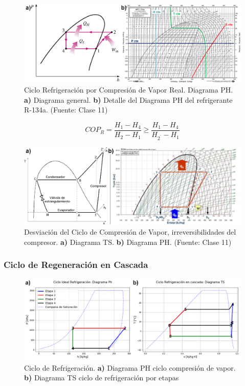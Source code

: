        \begin{figure}[H]
            \includegraphics[width=\textwidth]{img/clases/ciclo_carnot_inv_ph.png}
            \caption[Ciclo por Compresión de Vapor: Diagrama PH]{Ciclo Refrigeración por Compresión de Vapor Real. Diagrama PH. \textbf{a)} Diagrama general. \textbf{b)} Detalle del Diagrama PH del refrigerante R-134a. (Fuente: Clase 11)}
            \label{fig:ciclo_carnot_inv_ph}
        \end{figure}
        
        \[{COP}_{R} = \frac{H_{1}-H_{4}}{H_{2}-H_{1}} \geq \frac{H_{1}-H_{4}}{H_{2^{'}}-H_{1}}\]
        
        \begin{figure}[H]
            \includegraphics[width=\textwidth]{img/clases/ciclo_comp_vapor.png}
            \caption[Desviación del Ciclo por Compresión de Vapor]{Desviación del Ciclo de Compresión de Vapor, irreversibilidades del compresor. \textbf{a)} Diagrama TS. \textbf{b)} Diagrama PH. (Fuente: Clase 11)}
            \label{fig:ciclo_carnot_inv_desv}
        \end{figure}
    
        \subsubsection{Ciclo de Regeneración en Cascada}
        
        \begin{figure}
            \includegraphics[width=.9\textwidth]{img/ciclos/ciclo_refrigeracion.png}
            \caption[Ciclo de Refrigeración]{Ciclo de Refrigeración. \textbf{a)} Diagrama PH ciclo compresión de vapor. \textbf{b)} Diagrama TS ciclo de refrigeración por etapas}
            \label{fig:ciclo_ref}
        \end{figure}
        
